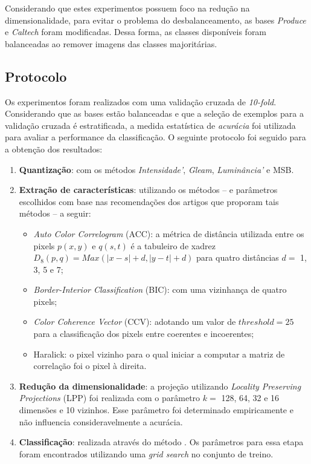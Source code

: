 Considerando que estes experimentos possuem foco na redução na dimensionalidade, para evitar o problema do desbalanceamento, as bases \textit{Produce} e \textit{Caltech} foram modificadas. Dessa forma, as classes disponíveis foram balanceadas ao remover imagens das classes majoritárias.

\subsection{Protocolo}

Os experimentos foram realizados com uma validação cruzada de \textit{10-fold}. Considerando que as bases estão balanceadas e que a seleção de exemplos para a validação cruzada é estratificada, a medida estatística de \textit{acurácia} foi utilizada para avaliar a performance da classificação. O seguinte protocolo foi seguido para a obtenção dos resultados:

\begin{enumerate}
\item \textbf{Quantização}: com os métodos \emph{Intensidade'}, \emph{Gleam}, \emph{Luminância'} e MSB.
\item \textbf{Extração de características}: utilizando os métodos -- e parâmetros escolhidos com base nas recomendações dos artigos que proporam tais métodos -- a seguir:
  \begin{itemize}
    \item \textit{Auto Color Correlogram} (ACC): a métrica de distância utilizada entre os pixels $p(x,y)$ e $q(s,t)$ é a tabuleiro de xadrez $D_8(p,q) = Max(|x-s| + d, |y-t| + d)$ para quatro distâncias $d =$ 1, 3, 5 e 7;
    \item \textit{Border-Interior Classification} (BIC): com uma vizinhança de quatro pixels;
    \item \textit{Color Coherence Vector} (CCV): adotando um valor de $\mathit{threshold} = 25$ para a classificação dos pixels entre coerentes e incoerentes;
    \item Haralick: o pixel vizinho para o qual iniciar a computar a matriz de correlação foi o pixel à direita.
  \end{itemize}
\item \textbf{Redução da dimensionalidade}: a projeção utilizando \textit{Locality Preserving Projections} (LPP) foi realizada com o parâmetro $k =$ 128, 64, 32 e 16 dimensões e 10 vizinhos. Esse parâmetro foi determinado empiricamente e não influencia consideravelmente a acurácia.
\item \textbf{Classificação}: realizada através do método . Os parâmetros para essa etapa foram encontrados utilizando uma \textit{grid search} no conjunto de treino.
\end{enumerate}

